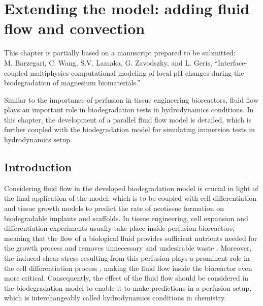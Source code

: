 \chapter{Extending the model: adding fluid flow and convection}\label{ch:fluid}

\begin{shaded}
This chapter is partially based on a manuscript prepared to be submitted:\\
M. Barzegari, C. Wang, S.V. Lamaka, G. Zavodszky, and L. Geris, ``Interface-coupled multiphysics computational modeling of local pH changes during the biodegradation of magnesium biomaterials.''
\end{shaded}

Similar to the importance of perfusion in tissue engineering bioreactors, fluid flow plays an important role in biodegradation tests in hydrodynamics conditions. In this chapter, the development of a parallel fluid flow model is detailed, which is further coupled with the biodegradation model for simulating immersion tests in hydrodynamics setup.

\section{Introduction}

Considering fluid flow in the developed biodegradation model is crucial in light of the final application of the model, which is to be coupled with cell differentiation and tissue growth models to predict the rate of neotissue formation on biodegradable implants and scaffolds. In tissue engineering, cell expansion and differentiation experiments usually take place inside perfusion bioreactors, meaning that the flow of a biological fluid provides sufficient nutrients needed for the growth process and removes unnecessary and undesirable waste \cite{Sikavitsas2005,Grayson2010,Sonnaert2014}. Moreover, the induced shear stress resulting from this perfusion plays a prominent role in the cell differentiation process \cite{Song2013,McCoy2012,Rauh2011,Papantoniou2013}, making the fluid flow inside the bioreactor even more critical. Consequently, the effect of the fluid flow should be considered in the biodegradation model to enable it to make predictions in a perfusion setup, which is interchangeably called hydrodynamics conditions in chemistry.

